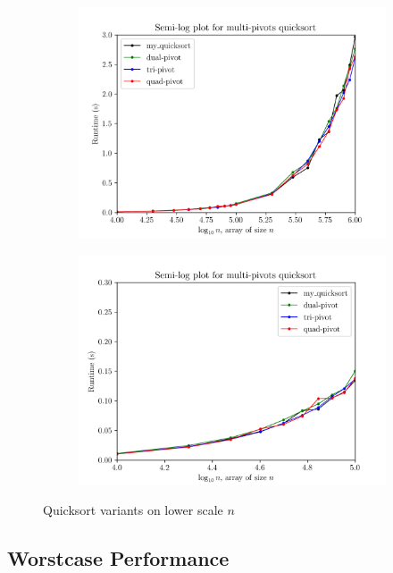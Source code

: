 \documentclass[titlepage, 12pt]{article}
\begin{document}
\begin{figure}[h]
  \centering
  \begin{subfigure}{0.5\textwidth}
    \centering
    \includegraphics[width=\linewidth]{multp-zoomed-1} 
  \end{subfigure}%
  \begin{subfigure}{0.5\textwidth}
    \centering
    \includegraphics[width=\linewidth]{multp-zoomed-2} 
  \end{subfigure}
  \caption{Quicksort variants on lower scale \( n \)}
  \label{fig:multp-zoomed}
\end{figure}

\subsection{Worstcase Performance}
\end{document}
